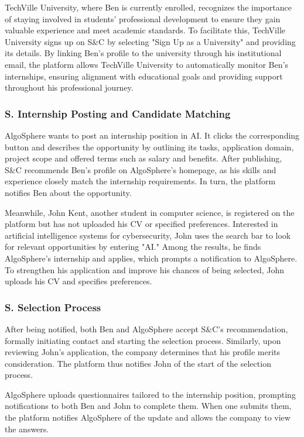 TechVille University, where Ben is currently enrolled, recognizes the importance of staying involved in students’ professional development to ensure they gain valuable experience and meet academic standards.
To facilitate this, TechVille University signs up on S\&C by selecting "Sign Up as a University" and providing its details.
By linking Ben’s profile to the university through his institutional email, the platform allows TechVille University to automatically monitor Ben’s internships, ensuring alignment with educational goals and providing support throughout his professional journey.

\subsubsection*{S\sco. Internship Posting and Candidate Matching}
AlgoSphere wants to post an internship position in AI. It clicks the corresponding button and describes the opportunity by outlining its tasks, application domain, project scope and offered terms such as salary and benefits.
After publishing, S\&C recommends Ben’s profile on AlgoSphere’s homepage, as his skills and experience closely match the internship requirements.
In turn, the platform notifies Ben about the opportunity.

Meanwhile, John Kent, another student in computer science, is registered on the platform but has not uploaded his CV or specified preferences.
Interested in artificial intelligence systems for cybersecurity, John uses the search bar to look for relevant opportunities by entering "AI."
Among the results, he finds AlgoSphere’s internship and applies, which prompts a notification to AlgoSphere.
To strengthen his application and improve his chances of being selected, John uploads his CV and specifies preferences.

\subsubsection*{S\sco. Selection Process}
After being notified, both Ben and AlgoSphere accept S\&C's recommendation, formally initiating contact and starting the selection process.
Similarly, upon reviewing John’s application, the company determines that his profile merits consideration.
The platform thus notifies John of the start of the selection process.

AlgoSphere uploads questionnaires tailored to the internship position, prompting notifications to both Ben and John to complete them.
When one submits them, the platform notifies AlgoSphere of the update and allows the company to view the answers.

